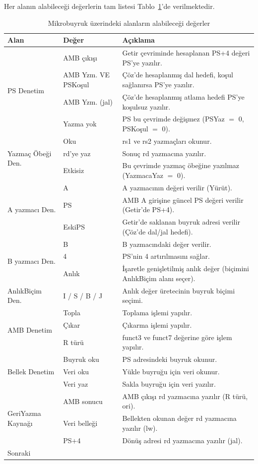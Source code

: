 Her alanın alabileceği değerlerin tam listesi Tablo~\ref{tab:mikrobuyruk-degerler}'de verilmektedir.

\begin{table}[htbp]
\centering
\caption{Mikrobuyruk üzerindeki alanların alabileceği değerler}
\label{tab:mikrobuyruk-degerler}
\small
\begin{tabular}{llp{8cm}}
\toprule
\textbf{Alan} & \textbf{Değer} & \textbf{Açıklama} \\
\midrule
\multirow{4}{*}{PS Denetim}
 & AMB çıkışı & Getir çevriminde hesaplanan PS+4 değeri PS'ye yazılır. \\
 & AMB Yzm. VE PSKoşul & Çöz'de hesaplanmış dal hedefi, koşul sağlanırsa PS'ye yazılır. \\
 & AMB Yzm. (jal) & Çöz'de hesaplanmış atlama hedefi PS'ye koşulsuz yazılır. \\
 & Yazma yok & PS bu çevrimde değişmez (PSYaz $=$ 0, PSKoşul $=$ 0). \\
\midrule
\multirow{3}{*}{Yazmaç Öbeği Den.}
 & Oku & rs1 ve rs2 yazmaçları okunur. \\
 & rd'ye yaz & Sonuç rd yazmacına yazılır. \\
 & Etkisiz & Bu çevrimde yazmaç öbeğine yazılmaz (YazmacaYaz $=$ 0). \\
\midrule
\multirow{3}{*}{A yazmacı Den.}
 & A & A yazmacının değeri verilir (Yürüt). \\
 & PS & AMB A girişine güncel PS değeri verilir (Getir'de PS+4). \\
 & EskiPS & Getir'de saklanan buyruk adresi verilir (Çöz'de dal/jal hedefi). \\
\midrule
\multirow{3}{*}{B yazmacı Den.}
 & B & B yazmacındaki değer verilir. \\
 & 4 & PS'nin 4 artırılmasını sağlar. \\
 & Anlık & İşaretle genişletilmiş anlık değer (biçimini AnlıkBiçim alanı seçer). \\
\midrule
AnlıkBiçim Den. & I / S / B / J & Anlık değer üretecinin buyruk biçimi seçimi. \\
\midrule
\multirow{3}{*}{AMB Denetim}
 & Topla & Toplama işlemi yapılır. \\
 & Çıkar & Çıkarma işlemi yapılır. \\
 & R türü & funct3 ve funct7 değerine göre işlem yapılır. \\
\midrule
\multirow{3}{*}{Bellek Denetim}
 & Buyruk oku & PS adresindeki buyruk okunur. \\
 & Veri oku & Yükle buyruğu için veri okunur. \\
 & Veri yaz & Sakla buyruğu için veri yazılır. \\
\midrule
\multirow{3}{*}{GeriYazma Kaynağı}
 & AMB sonucu & AMB çıkışı rd yazmacına yazılır (R türü, ori). \\
 & Veri belleği & Bellekten okunan değer rd yazmacına yazılır (lw). \\
 & PS$+$4 & Dönüş adresi rd yazmacına yazılır (jal). \\
\midrule
\multirow{3}{*}{Sonraki}


\end{tabular}
\end{table}
